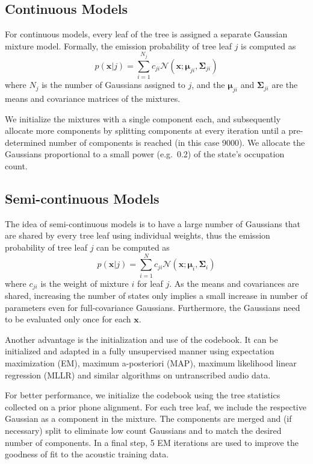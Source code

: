 \documentclass{article}
\def \x{{\mathbf x}}
\def \m{{\bm \mu}}
\def \k{{\mathbf \Sigma}}
\def \nv{{\mathcal N}}
\begin{document}
\subsection{Continuous Models}
For continuous models, every leaf of the tree is assigned a separate
Gaussian mixture model. Formally, the emission probability of tree leaf $j$ is 
computed as
\begin{equation}
p(\x | j) = \sum_{i=1}^{N_j} c_{ji} \nv(\x; \m_{ji}, \k_{ji}) 
\end{equation}
where $N_j$ is the number of Gaussians assigned to $j$, and the $\m_{ji}$ and
$\k_{ji}$ are the means and covariance matrices of the mixtures.

We initialize the mixtures with a single component each, and subsequently 
allocate more components by splitting components at every iteration until a 
pre-determined number of components is reached (in this case 9000). We allocate 
the Gaussians proportional to a small power (e.g.~0.2) of the state's 
occupation count.

\subsection{Semi-continuous Models}
The idea of semi-continuous models is to have a large number of Gaussians that
are shared by every tree leaf using individual weights, thus the emission 
probability of tree leaf $j$ can be computed as
\begin{equation}
p(\x | j) = \sum_{i=1}^{N} c_{ji} \nv(\x; \m_i, \k_i) 
\end{equation}
where $c_{ji}$ is the weight of mixture $i$ for leaf $j$. As the means
and covariances are shared, increasing the number of states only implies
a small increase in number of parameters even for full-covariance Gaussians.
Furthermore, the Gaussians need to be evaluated only once for each $\x$.

Another advantage is the initialization and use of the codebook. It can be
initialized and adapted in a fully unsupervised manner using expectation
maximization (EM), maximum a-posteriori (MAP), maximum likelihood linear
regression (MLLR) and similar algorithms on untranscribed audio data.

For better performance, we initialize the codebook using the tree statistics
collected on a prior phone alignment. For each tree leaf, we include
the respective Gaussian as a component in the mixture.
The components are merged and (if necessary) split to eliminate low count 
Gaussians and to match the desired number of components. In a final step, 
5 EM iterations are used to improve the goodness of fit to the acoustic 
training data.
\end{document}
